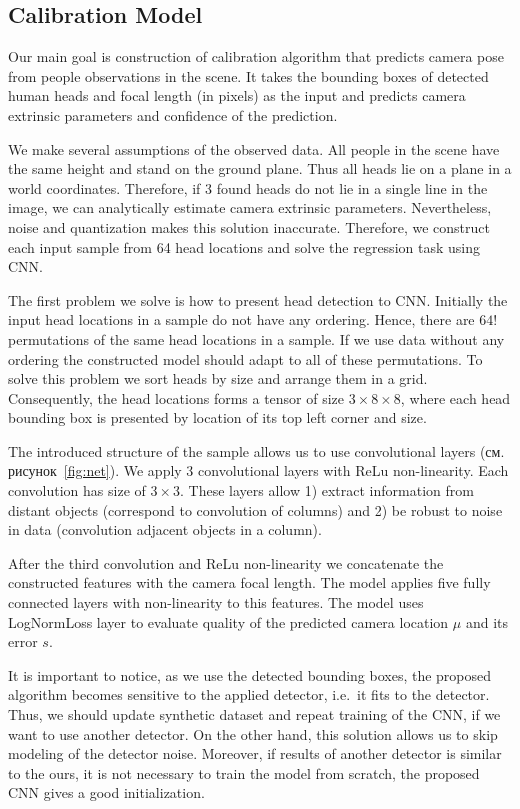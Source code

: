 \subsection{Calibration Model}
\label{sec:calibration}

Our main goal is construction of calibration algorithm that predicts camera pose from people observations in the scene. It takes the bounding boxes of detected human heads and focal length (in pixels) as the input and predicts camera extrinsic parameters and confidence of the prediction.

We make several assumptions of the observed data. All people in the scene have the same height and stand on the ground plane. Thus all heads lie on a plane in a world coordinates. Therefore, if 3 found heads do not lie in a single line in the image, we can analytically estimate camera extrinsic parameters. Nevertheless, noise and quantization makes this solution inaccurate. Therefore, we construct each input sample from 64 head locations and solve the regression task using CNN.

The first problem we solve is how to present head detection to CNN. Initially the input head locations in a sample do not have any ordering. Hence, there are $64!$ permutations of the same head locations in a sample. If we use data without any ordering the constructed model should adapt to all of these permutations. To solve this problem we sort heads by size and arrange them in a grid. Consequently, the head locations forms a tensor of size $3\times8\times8$, where each head bounding box is presented by location of its top left corner and size.

The introduced structure of the sample allows us to use convolutional layers (см. рисунок~\ref{fig:net}). We apply 3 convolutional layers with ReLu non-linearity. Each convolution has size of $3\times3$. These layers allow 1) extract information from distant objects (correspond to convolution of columns) and 2) be robust to noise in data (convolution adjacent objects in a column).

After the third convolution and ReLu non-linearity we concatenate the constructed features with the camera focal length. The model applies five fully connected layers with non-linearity to this features. The model uses LogNormLoss layer to evaluate quality of the predicted camera location $\mu$ and its error $s$.

It is important to notice, as we use the detected bounding boxes, the proposed algorithm becomes sensitive to the applied detector, i.e.\ it fits to the detector. Thus, we should update synthetic dataset and repeat training of the CNN, if we want to use another detector. On the other hand, this solution allows us to skip modeling of the detector noise. Moreover, if results of another detector is similar to the ours, it is not necessary to train the model from scratch, the proposed CNN gives a good initialization.


